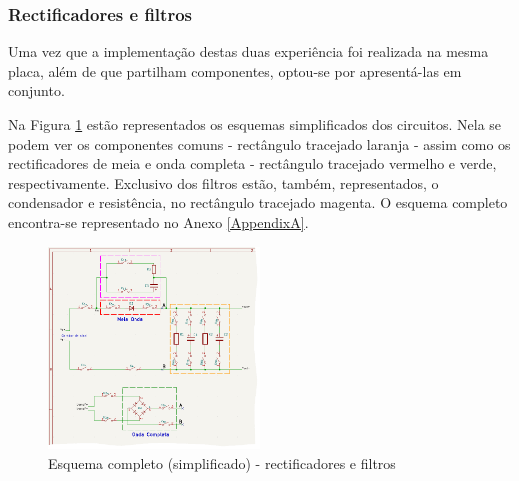 \subsubsection{Rectificadores e filtros}
\label{sec:rectificadoresfiltros}
Uma vez que a implementação destas duas experiência foi realizada na mesma placa, além de que partilham componentes, optou-se por apresentá-las em conjunto. 

Na Figura \ref{fig:rectificacao_filtragem_full} estão representados os esquemas simplificados dos circuitos. Nela se podem ver os componentes comuns - rectângulo tracejado laranja - assim como os rectificadores de meia e onda completa - rectângulo tracejado vermelho e verde, respectivamente. Exclusivo dos filtros estão, também, representados, o condensador e resistência, no rectângulo tracejado magenta. O esquema completo encontra-se representado no Anexo \ref{AppendixA}.

\begin{figure}[hbtp]
	\centering
	\includegraphics[width=0.5\textwidth]{figures/rec_fil_FULL.png}
	\caption{Esquema completo (simplificado) - rectificadores e filtros}
	\label{fig:rectificacao_filtragem_full}
\end{figure}

